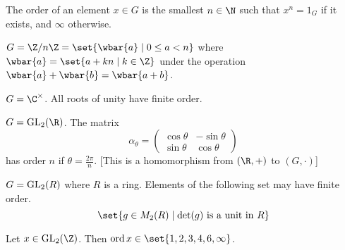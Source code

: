 
\begin{definition}[Order] \label{def:group:order}
    The order of an element $x \in G$ is the smallest $n \in \N$ such that
    $x^n = 1_G$ if it exists, and $\infty$ otherwise.
\end{definition}
\begin{examples}
    \item $G = \Z/n\Z = \set{\wbar{a} \mid 0 \le a < n}$ where
        $\wbar{a} = \set{a + kn \mid k \in \Z}$
        under the operation $\wbar{a} + \wbar{b} = \wbar{a + b}$.
    \item $G = \C^\times$. All roots of unity have finite order.
    \item $G = \GL_2(\R)$. The matrix \[
        \alpha_\theta = \begin{pmatrix}
            \cos \theta & -\sin \theta \\
            \sin \theta & \cos \theta
        \end{pmatrix}
    \] has order $n$ if $\theta = \frac{2\pi}{n}$.
    [This is a homomorphism from $(\R, +)$ to $(G, \cdot)$]
    \item $G = \operatorname{GL}_2(R)$ where $R$ is a ring.
        Elements of the following set may have finite order. \[
            \set{g \in M_2(R) \mid \det(g) \text{ is a unit in } R}
        \]
\end{examples}
\begin{proposition} \label{thm:group:crystal}
    Let $x \in \GL_2(\Z)$.
    Then $\ord x \in \set{1, 2, 3, 4, 6, \infty}$.
\end{proposition}

